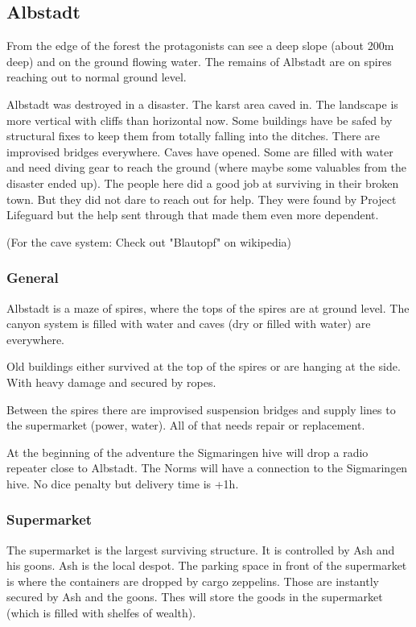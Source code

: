 \subsection{Albstadt}

From the edge of the forest the protagonists can see a deep slope (about 200m deep) and on the ground flowing water. The remains of Albstadt are on spires reaching out to normal ground level.

Albstadt was destroyed in a disaster. The karst area caved in. The landscape is more vertical with cliffs than horizontal now. Some buildings have be safed by structural fixes to keep them from totally falling into the ditches. There are improvised bridges everywhere. Caves have opened. Some are filled with water and need diving gear to reach the ground (where maybe some valuables from the disaster ended up).
The people here did a good job at surviving in their broken town. But they did not dare to reach out for help. They were found by Project Lifeguard but the help sent through that made them even more dependent.

(For the cave system: Check out "Blautopf" on wikipedia)

\subsubsection{General}

Albstadt is a maze of spires, where the tops of the spires are at ground level. The canyon system is filled with water and caves (dry or filled with water) are everywhere.

Old buildings either survived at the top of the spires or are hanging at the side. With heavy damage and secured by ropes.

Between the spires there are improvised suspension bridges and supply lines to the supermarket (power, water). All of that needs repair or replacement.

At the beginning of the adventure the Sigmaringen hive will drop a radio repeater close to Albstadt. The Norms will have a connection to the Sigmaringen hive. No dice penalty but delivery time is +1h.

\subsubsection{Supermarket}

The supermarket is the largest surviving structure. It is controlled by Ash and his goons. Ash is the local despot. The parking space in front of the supermarket is where the containers are dropped by cargo zeppelins. Those are instantly secured by Ash and the goons.
Thes will store the goods in the supermarket (which is filled with shelfes of wealth).

